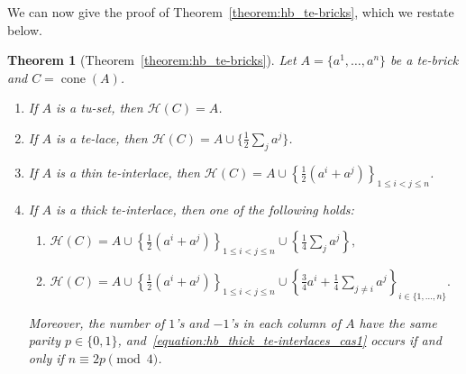 \documentclass[11pt,a4paper]{amsart}
\renewcommand*{\leq}{\leqslant}
\theoremstyle{plain}
\newtheorem{theorem}{Theorem}[section]%
\theoremstyle{definition}
\newcommand{\cal}[1]{\mathcal{#1}}
\DeclareMathOperator{\cone}{cone}
\renewcommand{\cal}[1]{\mathcal{#1}}
\begin{document}
We can now give the proof of Theorem~\ref{theorem:hb_te-bricks}, which we restate below.
\begin{theorem}[Theorem~\ref{theorem:hb_te-bricks}]\label{theorem:hb_te-bricks_full}
Let $A = \{a^1,\ldots,a^n\}$ be a te-brick and $C = \cone (A)$.	
\begin{enumerate}[label=\arabic*., ref=\arabic*.]
\item If $A$ is a tu-set, then $\cal H(C)= A$.\label{equation:hb_tu-set_l}
\item If $A$ is a te-lace, then $\cal H(C)= A\cup\{\frac{1}{2}\sum_j a^j\}$.\label{equation:hb_te-lace_l}
\item If $A$ is a thin te-interlace, then $\cal H(C) = A\cup \left\{\frac{1}{2} (a^i + a^j)\right\}_{1\leq i<j\leq n}$.\label{equation:hb_thin_te-interlace_l}
\item If $A$ is a thick te-interlace, then one of the following holds: \label{equation:hb_thick_te-interlace_l}
\begin{enumerate}[label=\alph*., ref=\theenumi\alph*]
	\item $\cal H(C) = A\cup \left\{\frac{1}{2} (a^i + a^j)\right\}_{1\leq i< j\leq n}\cup\left\{\frac{1}{4}\sum_{j} a^j\right\},$ \label{equation:hb_thick_te-interlaces_cas1_l}
	\item $\cal H(C) = A\cup\left\{\frac{1}{2} (a^i + a^j)\right\}_{1\leq i< j\leq n}\cup\left\{\frac{3}{4}a^i+\frac{1}{4}\sum_{j\neq i} a^j\right\}_{i\in\{1,\ldots,n\}}.$ \label{equation:hb_thick_te-interlaces_cas2_l}
\end{enumerate}
Moreover, the number of $1$'s and $-1$'s in each column of $A$ have the same parity $p\in\{0,1\}$, and~\ref{equation:hb_thick_te-interlaces_cas1} occurs if and only if $n\equiv 2p \pmod{4}$.
\end{enumerate}
\end{theorem}
\end{document}
